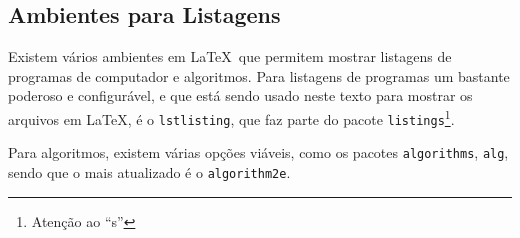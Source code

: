 \subsection{Ambientes para Listagens}

Existem vários ambientes em \LaTeX\ que permitem mostrar
listagens de programas de computador e algoritmos.
Para listagens de programas um bastante poderoso e configurável,
e que está sendo usado neste texto para mostrar os arquivos
em \LaTeX, é o \lstinline|lstlisting|, que faz parte do pacote
\lstinline|listings|\footnote{Atenção ao ``s''}.

Para algoritmos, existem várias opções viáveis, como os pacotes
\lstinline|algorithms|, \lstinline|alg|, sendo que o mais atualizado é o \lstinline|algorithm2e|.












